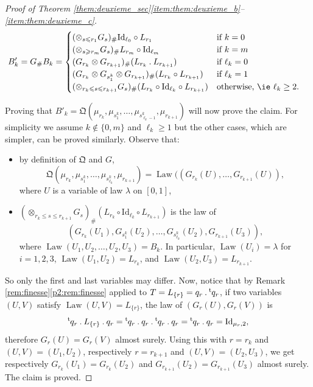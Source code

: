 \documentclass[JEP,XML,SOM,Unicode,NoEqCountersInSection,NoFloatCountersInSection,published]{cedram}
\newcommand{\ldot}{\mathbin{.}}
\theoremstyle{plain}
\theoremstyle{definition}
\newcommand{\id}{\mathrm{Id}}
\newcommand{\como}{\mathfrak{Q}}
\newcommand{\trans}{{}^{\mathrm{t}}\mkern-1mu}
\newcommand{\la}{\lambda}
\newcommand{\law}{\operatorname{Law}}
\begin{document}
\begin{proof}[Proof of Theorem \ref{them:deuxieme_sec}\eqref{item:them:deuxieme_b}--\eqref{item:them:deuxieme_c}]
\begin{align*}
B'_k&=G_\# B_k=\begin{cases}
(\otimes_{s\leqslant r_1} G_{s})_\#\id_{\ell_0}\circ L_{r_1}&\text{if }k=0\\
(\otimes_{s\geqslant r_m} G_{s})_\#L_{r_m}\circ \id_{\ell_m}&\text{if }k=m\\
(G_{r_k}\otimes G_{r_{k+1}})_\#(L_{r_{k}}{}\ldot L_{r_{k+1}})&\text{if }\ell_k=0\\
(G_{r_k}\otimes G_{s_1^k}\otimes G_{r_{k+1}})_\#(L_{r_{k}}\circ L_{r_{k+1}})&\text{if }\ell_k=1\\
(\otimes_{r_k\leqslant s\leqslant r_{k+1}}G_s)_\#(L_{r_{k}}\circ\id_{\ell_k}\circ L_{r_{k+1}})&\text{otherwise, \ie }\ell_k\geq 2.
\end{cases}
\end{align*}

\noindent Proving that $B'_k=\como(\mu_{r_k},\mu_{s^k_1},\ldots,\mu_{s^k_{\ell_k-1}},\mu_{r_{k+1}})$ will now prove the claim. For simplicity we assume $k\notin \{0,m\}$ and $\ell_k\geq 1$ but the other cases, which are simpler, can be proved similarly. Observe that:
\begin{itemize}
\item
by definition of $\como$ and $G$,
\[
\como(\mu_{r_k},\mu_{s_1^k},\ldots,\mu_{s^k_{\ell_k}},\mu_{r_{k+1}})=\law((G_{r_k}(U),\ldots,G_{r_{k+1}}(U)),
\]
where $U$ is a variable of law $\la$ on $[0,1]$,

\item
$(\otimes_{r_k\leqslant s\leqslant r_{k+1}}G_s)_\#(L_{r_{k}}\circ\id_{\ell_k}\circ L_{r_{k+1}})$ is the law of
\[
(G_{r_k}(U_1),G_{s^k_1}(U_2),\ldots,G_{s^k_{\ell_k}}(U_2),G_{r_{k+1}}(U_3)),
\]
where $\law(U_1,U_2,\ldots,U_2,U_3)=B_k$. In particular, $\law(U_i)=\la$ for $i=1,2,3$, $\law(U_1,U_2)=L_{r_k}$, and $\law(U_2,U_3)=L_{r_{k+1}}$.
\end{itemize}
So only the first and last variables may differ. Now, notice that by Remark \ref{rem:finesse}\eqref{p2:rem:finesse} applied to $T=L_{\{r\}}=q_r\ldot\trans q_r$, if two variables $(U,V)$ satisfy $\law(U,V)=L_{\{r\}}$, the law of $(G_{r}(U),G_r(V))$ is
\[
\trans q_r\ldot L_{\{r\}}{}\ldot q_r=\trans q_r\ldot q_r\ldot\trans q_r\ldot q_r=\trans q_r\ldot q_r=\id_{\mu_r,2},
\]
therefore $G_{r}(U)=G_r(V)$ almost surely. Using this with $r={r_k}$ and $(U,V)=(U_1,U_2)$, respectively $r=r_{k+1}$ and $(U,V)=(U_2,U_3)$, we get respectively $G_{r_k}(U_1)=G_{r_k}(U_2)$ and $G_{r_{k+1}}(U_2)=G_{r_{k+1}}(U_3)$ almost surely. The claim is proved.


\end{proof}
\end{document}

